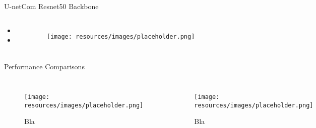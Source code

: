\begin{frame}[c]{U-net}{Com Resnet50 Backbone}

        \begin{columns}

            \begin{itemize}
                  \item 
                  \item 
            \end{itemize}

            \begin{figure}[h]
                \centering
                \texttt{[image: resources/images/placeholder.png]}
            \end{figure}

        \end{columns}
    
  \end{frame}

\begin{frame}{Performance Comparisons}

    \begin{columns}
        \begin{figure}[h]
            \centering
            \texttt{[image: resources/images/placeholder.png]}
            \captionsetup{labelformat=empty}
            \caption{Bla}
        \end{figure}

        \begin{figure}[h]
            \centering
            \texttt{[image: resources/images/placeholder.png]}
            \captionsetup{labelformat=empty}
            \caption{Bla}
        \end{figure}
    \end{columns}
    
\end{frame}

